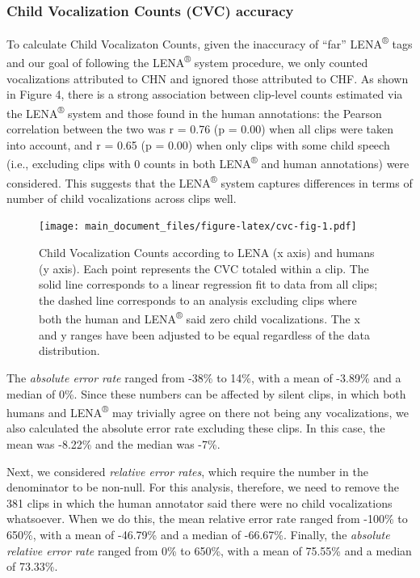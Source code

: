 \documentclass[english,table,man,floatsintext]{apa6}
\begin{document}
\hypertarget{child-vocalization-counts-cvc-accuracy}{%
\subsubsection{Child Vocalization Counts (CVC) accuracy}\label{child-vocalization-counts-cvc-accuracy}}

To calculate Child Vocalizaton Counts, given the inaccuracy of \enquote{far} LENA\textsuperscript{®} tags and our goal of following the LENA\textsuperscript{®} system procedure, we only counted vocalizations attributed to CHN and ignored those attributed to CHF. As shown in Figure 4, there is a strong association between clip-level counts estimated via the LENA\textsuperscript{®} system and those found in the human annotations: the Pearson correlation between the two was r = 0.76 (p = 0.00) when all clips were taken into account, and r = 0.65 (p = 0.00) when only clips with some child speech (i.e., excluding clips with 0 counts in both LENA\textsuperscript{®} and human annotations) were considered. This suggests that the LENA\textsuperscript{®} system captures differences in terms of number of child vocalizations across clips well.

\begin{figure}
\centering
\texttt{[image: main\_document\_files/figure-latex/cvc-fig-1.pdf]}
\caption{\label{fig:cvc-fig}Child Vocalization Counts according to LENA (x axis) and humans (y axis). Each point represents the CVC totaled within a clip. The solid line corresponds to a linear regression fit to data from all clips; the dashed line corresponds to an analysis excluding clips where both the human and LENA\textsuperscript{®} said zero child vocalizations. The x and y ranges have been adjusted to be equal regardless of the data distribution.}
\end{figure}

The \emph{absolute error rate} ranged from -38\% to 14\%, with a mean of -3.89\% and a median of 0\%. Since these numbers can be affected by silent clips, in which both humans and LENA\textsuperscript{®} may trivially agree on there not being any vocalizations, we also calculated the absolute error rate excluding these clips. In this case,
the mean was -8.22\% and the median was -7\%.

Next, we considered \emph{relative error rates}, which require the number in the denominator to be non-null. For this analysis, therefore, we need to remove the 381 clips in which the human annotator said there were no child vocalizations whatsoever. When we do this, the mean relative error rate ranged from -100\% to 650\%, with a mean of -46.79\% and a median of -66.67\%. Finally, the \emph{absolute relative error rate} ranged from 0\% to 650\%, with a mean of 75.55\% and a median of 73.33\%.
\end{document}
